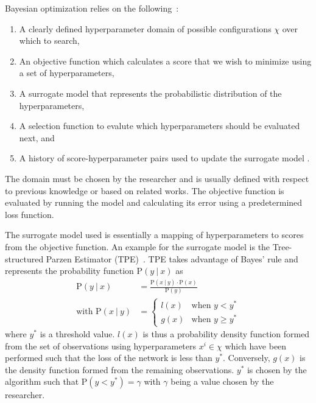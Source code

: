 Bayesian optimization relies on the following~\cite{bayesiantds}:
\begin{enumerate}
	\itemsep-1em
	\item A clearly defined hyperparameter domain of possible configurations $\chi$ over which to search,
	\item An objective function which calculates a score that we wish to minimize using a set of hyperparameters,
	\item A surrogate model that represents the probabilistic distribution of the hyperparameters,
	\item A selection function to evalute which hyperparameters should be evaluated next, and
	\item A history of score-hyperparameter pairs used to update the surrogate model .
\end{enumerate}
The domain must be chosen by the researcher and is usually defined with respect to previous knowledge or based on related works.
The objective function is evaluated by running the model and calculating its error using a predetermined loss function.

The surrogate model used is essentially a mapping of hyperparameters to scores from the objective function.
An example for the surrogate model is the Tree-structured Parzen Estimator (TPE)~\cite{tpe}.
TPE takes advantage of Bayes' rule and represents the probability function $\text{P}(y~|~x)$ as
\begin{equation}\label{eq:bohb-1}
	\begin{split}
		\text{P}(y~|~x) &= \frac{\text{P}(x~|~y) \cdot \text{P}(x)}{\text{P}(y)}\\
		\text{with } \text{P}(x~|~y) &=
		\begin{cases}
		l(x) &\text{when } y < y^* \\
		g(x) &\text{when } y \geq y^*
		\end{cases}
	\end{split}
\end{equation}
where $y^*$ is a threshold value. $l(x)$ is thus a probability density function formed from the set of observations using hyperparameters $x^i \in \chi$ which have been performed such that the loss of the network is less than $y^*$. 
Conversely, $g(x)$ is the density function formed from the remaining observations.
$y^*$ is chosen by the algorithm such that $\text{P}(y<y^*) = \gamma$ with $\gamma$ being a value chosen by the researcher.

